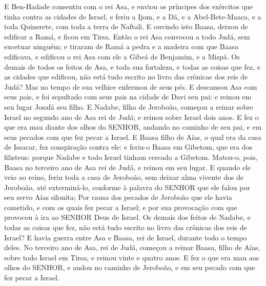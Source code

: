 {  E Ben-Hadade consentiu com o rei Asa, e enviou os príncipes dos exércitos que tinha contra as cidades de Israel, e feriu a Ijom, e a Dã, e a Abel-Bete-Maaca, e a toda Quinerete, com toda a terra de Naftali.
  E ouvindo isto Baasa, deixou de edificar a Ramá, e ficou em Tirsa.
  Então o rei Asa convocou a todo Judá, sem excetuar ninguém; e tiraram de Ramá a pedra e a madeira com que Baasa edificava, e edificou o rei Asa com ele a Gibeá de Benjamim, e a Mispá.
  Os demais de todos os feitos de Asa, e toda sua fortaleza, e todas as coisas que fez, e as cidades que edificou, não está tudo escrito no livro das crônicas dos reis de Judá? Mas no tempo de sua velhice enfermou de seus pés.
  E descansou Asa com seus pais, e foi sepultado com seus pais na cidade de Davi seu pai: e reinou em seu lugar Josafá seu filho.
  E Nadabe, filho de Jeroboão, começou a reinar sobre Israel no segundo ano de Asa rei de Judá; e reinou sobre Israel dois anos.
  E fez o que era mau diante dos olhos do SENHOR, andando no caminho de seu pai, e em seus pecados com que fez pecar a Israel.
  E Baasa filho de Aías, o qual era da casa de Issacar, fez conspiração contra ele: e feriu-o Baasa em Gibetom, que era dos filisteus: porque Nadabe e todo Israel tinham cercado a Gibetom.
  Matou-o, pois, Baasa no terceiro ano de Asa rei de Judá, e reinou em seu lugar.
  E quando ele veio ao reino, feriu toda a casa de Jeroboão, sem deixar alma vivente dos de Jeroboão, até exterminá-lo, conforme à palavra do SENHOR que ele falou por seu servo Aías silonita;
  Por causa dos pecados de Jeroboão que ele havia cometido, e com os quais fez pecar a Israel; e por sua provocação com que provocou à ira ao SENHOR Deus de Israel.
  Os demais dos feitos de Nadabe, e todas as coisas que fez, não está tudo escrito no livro das crônicas dos reis de Israel?
  E havia guerra entre Asa e Baasa, rei de Israel, durante todo o tempo deles.
  No terceiro ano de Asa, rei de Judá, começou a reinar Baasa, filho de Aías, sobre todo Israel em Tirsa; e reinou vinte e quatro anos.
  E fez o que era mau aos olhos do SENHOR, e andou no caminho de Jeroboão, e em seu pecado com que fez pecar a Israel.
\par }

